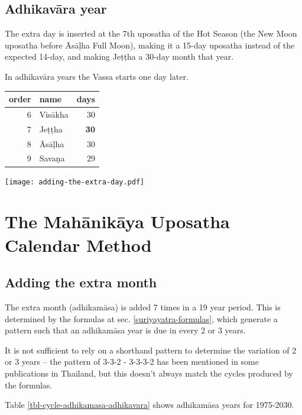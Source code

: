 \documentclass[11pt,oneside]{memoir-article}
\begin{document}
\section{Adhikavāra year}
\label{sec-1-4}

The extra day is inserted at the 7th uposatha of the Hot Season (the New Moon
uposatha before Āsāḷha Full Moon), making it a 15-day uposatha instead of the
expected 14-day, and making Jeṭṭha a 30-day month that
year.\autocite{hasapannyo-zodiac}

In adhikavāra years the Vassa starts one day later.

\begin{center}
\begin{tabular}{rlr}
order & name & days\\
\hline
6 & Visākha & 30\\
7 & Jeṭṭha & \textbf{30}\\
8 & Āsāḷha & 30\\
9 & Savaṇa & 29\\
\end{tabular}
\end{center}

\texttt{[image: adding-the-extra-day.pdf]}

\label{uposatha-tutorial-end}

\clearpage

\chapter{The Mahānikāya Uposatha Calendar Method}
\label{sec-2}
\section{Adding the extra month}
\label{sec-2-1}

The extra month (adhikamāsa) is added 7 times in a 19 year period. This is
determined by the formulas at sec. \ref{suriyayatra-formulas}, which generate a pattern
such that an adhikamāsa year is due in every 2 or 3 years.

It is not sufficient to rely on a shorthand pattern to determine the variation
of 2 or 3 years -- the pattern of 3-3-2 - 3-3-3-2 has been mentioned in some
publications in Thailand, but this doesn't always match the cycles produced by
the formulas.

Table \ref{tbl-cycle-adhikamasa-adhikavara} shows adhikamāsa years for 1975-2030.

\end{document}
